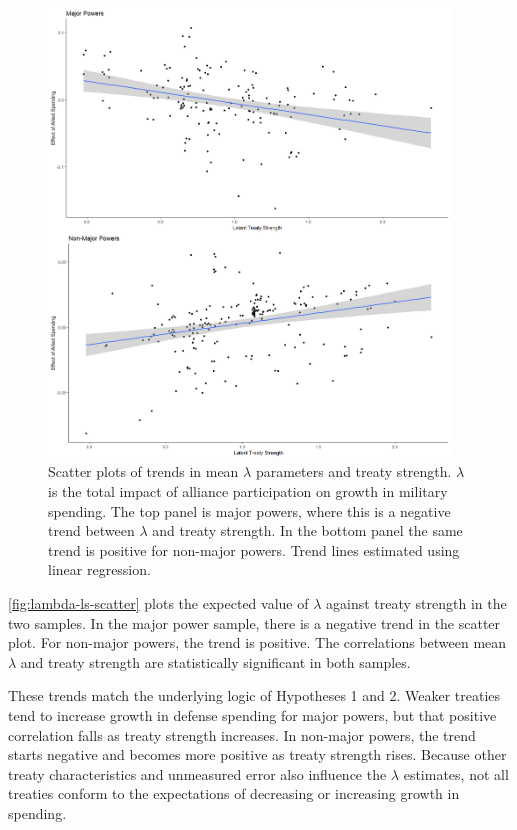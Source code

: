 \documentclass[12pt]{article}
\begin{document}
\begin{figure}[htbp]
	\centering
		\includegraphics[width=0.95\textwidth]{../figures/lambda-ls-scatter.png}
	\caption{Scatter plots of trends in mean $\lambda$ parameters and treaty strength. $\lambda$ is the total impact of alliance participation on growth in military spending. The top panel is major powers, where this is a negative trend between $\lambda$ and treaty strength. In the bottom panel the same trend is positive for non-major powers. Trend lines estimated using linear regression.}
	\label{fig:lambda-ls-scatter}
\end{figure}


\autoref{fig:lambda-ls-scatter} plots the expected value of $\lambda$ against treaty strength in the two samples. 
In the major power sample, there is a negative trend in the scatter plot.
For non-major powers, the trend is positive.
The correlations between mean $\lambda$ and treaty strength are statistically significant in both samples. 


These trends match the underlying logic of Hypotheses 1 and 2. 
Weaker treaties tend to increase growth in defense spending for major powers, but that positive correlation falls as treaty strength increases. 
In non-major powers, the trend starts negative and becomes more positive as treaty strength rises. 
Because other treaty characteristics and unmeasured error also influence the $\lambda$ estimates, not all treaties conform to the expectations of decreasing or increasing growth in spending. 
\end{document}
